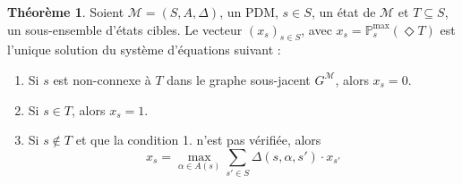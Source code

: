 \documentclass[12pt,a4paper]{report}
\theoremstyle{definition}%
\newtheorem{theorem}{Théorème}[chapter]
\theoremstyle{remark}
\newcommand{\pr}{\mathbb{P}}
\let\labelitemi\labelitemii
\begin{document}
\begin{theorem} \label{PDM-acc-thm}
	Soient $\mathcal{M} = (S, A, \Delta)$, un PDM, $s \in S$, un état de $\mathcal{M}$
	et $T \subseteq S$, un sous-ensemble d'états cibles. Le vecteur $(x_s)_{s \in S}$,
	avec $x_s = \pr^{\max}_s(\Diamond T)$ est l'unique solution du système d'équations
	suivant :
	\begin{enumerate}
		\item Si $s$ est non-connexe à $T$ dans le graphe sous-jacent $G^\mathcal{M}$,
			alors $x_s = 0$.
		\item Si $s \in T$, alors $x_s = 1$.
		\item Si $s \not\in T$ et que la condition 1. n'est pas vérifiée, alors
			\[
				x_s = \max_{\alpha \in A(s)} \sum_{s' \in S} \Delta(s, \alpha, s') \cdot x_{s'}
			\]
	\end{enumerate}
\end{theorem}
\end{document}

